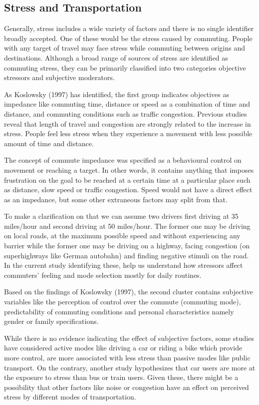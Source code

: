 \documentclass[
11pt, %
oneside, %
english, %
singlespacing, %
]{macthesis} %
\begin{document}
\hypertarget{stress-and-transportation}{%
\subsection{Stress and Transportation}\label{stress-and-transportation}}

Generally, stress includes a wide variety of factors and there is no single identifier broadly accepted. One of these would be the stress caused by commuting. People with any target of travel may face stress while commuting between origins and destinations. Although a broad range of sources of stress are identified as commuting stress, they can be primarily classified into two categories objective stressors and subjective moderators.

As Koslowsky (1997) has identified, the first group indicates objectives as impedance like commuting time, distance or speed as a combination of time and distance, and commuting conditions such as traffic congestion. Previous studies reveal that length of travel and congestion are strongly related to the increase in stress. People feel less stress when they experience a movement with less possible amount of time and distance.

The concept of commute impedance was specified as a behavioural control on movement or reaching a target. In other words, it contains anything that imposes frustration on the goal to be reached at a certain time at a particular place such as distance, slow speed or traffic congestion. Speed would not have a direct effect as an impedance, but some other extraneous factors may split from that.

To make a clarification on that we can assume two drivers first driving at 35 miles/hour and second driving at 50 miles/hour. The former one may be driving on local roads, at the maximum possible speed and without experiencing any barrier while the former one may be driving on a highway, facing congestion (on superhighways like German autobahn) and finding negative stimuli on the road. In the current study identifying these, help us understand how stressors affect commuters' feeling and mode selection mostly for daily routines.

Based on the findings of Koslowsky (1997), the second cluster contains subjective variables like the perception of control over the commute (commuting mode), predictability of commuting conditions and personal characteristics namely gender or family specifications.

While there is no evidence indicating the effect of subjective factors, some studies have considered active modes like driving a car or riding a bike which provide more control, are more associated with less stress than passive modes like public transport. On the contrary, another study hypothesizes that car users are more at the exposure to stress than bus or train users. Given these, there might be a possibility that other factors like noise or congestion have an effect on perceived stress by different modes of transportation.
\end{document}

